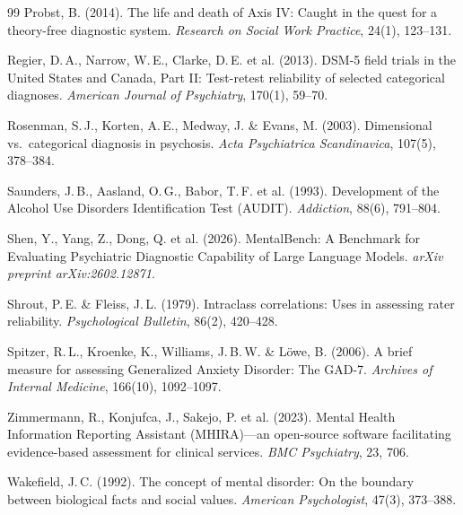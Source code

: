 \documentclass[11pt,a4paper]{article}
\begin{document}
\begin{thebibliography}{99}
Probst, B. (2014).
\newblock The life and death of Axis IV: Caught in the quest for a theory-free diagnostic system.
\newblock \textit{Research on Social Work Practice}, 24(1), 123--131.

Regier, D.\,A., Narrow, W.\,E., Clarke, D.\,E. et al. (2013).
\newblock DSM-5 field trials in the United States and Canada, Part II: Test-retest reliability of selected categorical diagnoses.
\newblock \textit{American Journal of Psychiatry}, 170(1), 59--70.

Rosenman, S.\,J., Korten, A.\,E., Medway, J. \& Evans, M. (2003).
\newblock Dimensional vs.\ categorical diagnosis in psychosis.
\newblock \textit{Acta Psychiatrica Scandinavica}, 107(5), 378--384.

Saunders, J.\,B., Aasland, O.\,G., Babor, T.\,F. et al. (1993).
\newblock Development of the Alcohol Use Disorders Identification Test (AUDIT).
\newblock \textit{Addiction}, 88(6), 791--804.

Shen, Y., Yang, Z., Dong, Q. et al. (2026).
\newblock MentalBench: A Benchmark for Evaluating Psychiatric Diagnostic Capability of Large Language Models.
\newblock \textit{arXiv preprint arXiv:2602.12871}.

Shrout, P.\,E. \& Fleiss, J.\,L. (1979).
\newblock Intraclass correlations: Uses in assessing rater reliability.
\newblock \textit{Psychological Bulletin}, 86(2), 420--428.

Spitzer, R.\,L., Kroenke, K., Williams, J.\,B.\,W. \& L\"owe, B. (2006).
\newblock A brief measure for assessing Generalized Anxiety Disorder: The GAD-7.
\newblock \textit{Archives of Internal Medicine}, 166(10), 1092--1097.

Zimmermann, R., Konjufca, J., Sakejo, P. et al. (2023).
\newblock Mental Health Information Reporting Assistant (MHIRA)---an open-source software facilitating evidence-based assessment for clinical services.
\newblock \textit{BMC Psychiatry}, 23, 706.

Wakefield, J.\,C. (1992).
\newblock The concept of mental disorder: On the boundary between biological facts and social values.
\newblock \textit{American Psychologist}, 47(3), 373--388.


\end{thebibliography}
\end{document}
